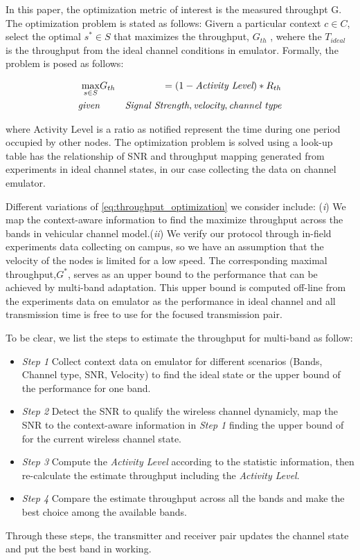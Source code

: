 In this paper, the optimization metric of interest is the measured throughpt G. The optimization problem is stated as follows: Givern a particular context ${c\in C}$, select the optimal $s^* \in S$ that maximizes the throughput, $G_{th}$ , wehere the $T_{ideal}$ is the throughput from the ideal channel conditions in emulator. Formally, the problem is posed as follows:


\begin{eqnarray}
\max_{s \in S}& G_{th}& = (1-\mbox{\it Activity Level})*R_{th} \label{eq:throughput_optimization} \\
		\mbox{\it given} & & \mbox{\it Signal Strength}, \mbox{\it velocity}, \mbox{\it channel type} \nonumber
		\end{eqnarray}

where Activity Level is a ratio as notified represent the time during one period occupied by other nodes. The optimization problem is solved using a look-up table has the relationship of SNR and throughput mapping generated from experiments in ideal channel states, in our case collecting the data on channel emulator.  


Different variations of \ref{eq:throughput_optimization} we consider include: (\emph{i}) We map the context-aware information to find the maximize throughput across the bands in vehicular channel model.(\emph{ii}) We verify our protocol through in-field experiments data collecting on campus, so we have an assumption that the velocity of the nodes is limited for a low speed. The corresponding maximal throughput,$G^*$, serves as an upper bound to the performance that can be achieved by multi-band adaptation. This upper bound is computed off-line from the experiments data on emulator as the performance in ideal channel and all transmission time is free to use for the focused transmission pair.






To be clear, we list the steps to estimate the throughput for multi-band as follow:

\begin{itemize}
\item \emph{Step 1} Collect context data on emulator for different scenarios (Bands, Channel type, SNR, Velocity) to find the ideal state or the upper bound of the performance for one band.
\item \emph{Step 2} Detect the SNR to qualify the wireless channel dynamicly, map the SNR to the context-aware information in \emph{Step 1} finding the upper bound of for the current wireless channel state.  
\item \emph{Step 3} Compute the \emph{Activity Level} according to the statistic information, then re-calculate the estimate throughput including the \emph{Activity Level}.
\item \emph{Step 4} Compare the estimate throughput across all the bands and make the best choice among the available bands.
\end{itemize}

Through these steps, the transmitter and receiver pair updates the channel state and put the best band in working.








